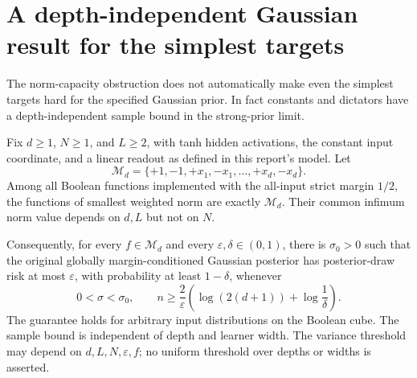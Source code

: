 \section{A depth-independent Gaussian result for the simplest targets}
\label{sec:simpletargets}

The norm-capacity obstruction does not automatically make even the simplest
targets hard for the specified Gaussian prior. In fact constants and dictators
have a depth-independent sample bound in the strong-prior limit.

\begin{theorem}
Fix $d\ge1$, $N\ge1$, and $L\ge2$, with tanh hidden activations, the constant
input coordinate, and a linear readout as defined in this report's model. Let
\[
 \mathcal M_d=\{+1,-1,+x_1,-x_1,\ldots,+x_d,-x_d\}.
\]
Among all Boolean functions implemented with the all-input strict margin
$1/2$, the functions of smallest weighted norm are exactly $\mathcal M_d$.
Their common infimum norm value depends on $d,L$ but not on $N$.

Consequently, for every $f\in\mathcal M_d$ and every $\varepsilon,\delta\in(0,1)$,
there is $\sigma_0>0$ such that the original globally margin-conditioned
Gaussian posterior has posterior-draw risk at most $\varepsilon$, with
probability at least $1-\delta$, whenever
\[
 0<\sigma<\sigma_0,\qquad
 n\ge\frac2\varepsilon
       \left(\log(2(d+1))+\log\frac1\delta\right).
\]
The guarantee holds for arbitrary input distributions on the Boolean cube.
The sample bound is independent of depth and learner width.
The variance threshold may depend on $d,L,N,\varepsilon,f$; no uniform
threshold over depths or widths is asserted.
\end{theorem}


